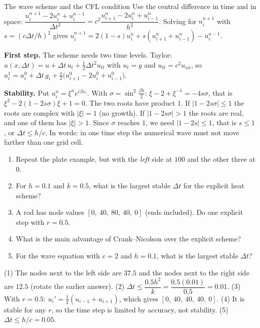 \begin{derivbox}{The wave scheme and the CFL condition}
Use the central difference in time and in space: $\dfrac{u_i^{n+1} - 2u_i^n + u_i^{n-1}}{\Delta t^2} = c^2\dfrac{u_{i+1}^n - 2u_i^n + u_{i-1}^n}{h^2}$. Solving for $u_i^{n+1}$ with $s = (c\Delta t/h)^2$ gives $u_i^{n+1} = 2(1-s)u_i^n + s(u_{i+1}^n + u_{i-1}^n) - u_i^{n-1}$.

\textbf{First step.} The scheme needs two time levels. Taylor: $u(x,\Delta t) = u + \Delta t\,u_t + \tfrac12\Delta t^2u_{tt}$ with $u_t = g$ and $u_{tt} = c^2u_{xx}$, so $u_i^1 = u_i^0 + \Delta t\,g_i + \tfrac s2\big(u_{i+1}^0 - 2u_i^0 + u_{i-1}^0\big)$.

\textbf{Stability.} Put $u_i^n = \xi^ne^{i\beta x_i}$. With $\sigma = \sin^2\frac{\beta h}{2}$: $\xi - 2 + \xi^{-1} = -4s\sigma$, that is $\xi^2 - 2(1 - 2s\sigma)\xi + 1 = 0$. The two roots have product $1$. If $|1 - 2s\sigma|\le1$ the roots are complex with $|\xi|=1$ (no growth). If $|1-2s\sigma|>1$ the roots are real, and one of them has $|\xi|>1$. Since $\sigma$ reaches $1$, we need $|1 - 2s|\le1$, that is $s\le1$, or $\Delta t\le h/c$. In words: in one time step the numerical wave must not move farther than one grid cell.
\end{derivbox}

\begin{practicebox}
\begin{enumerate}
  \item Repeat the plate example, but with the \emph{left} side at $100$ and the other three at $0$.
  \item For $h=0.1$ and $k=0.5$, what is the largest stable $\Delta t$ for the explicit heat scheme?
  \item A rod has node values $[0,\ 40,\ 80,\ 40,\ 0]$ (ends included). Do one explicit step with $r=0.5$.
  \item What is the main advantage of Crank--Nicolson over the explicit scheme?
  \item For the wave equation with $c=2$ and $h=0.1$, what is the largest stable $\Delta t$?
\end{enumerate}
\end{practicebox}

\begin{answerbox}
(1) The nodes next to the left side are $37.5$ and the nodes next to the right side are $12.5$ (rotate the earlier answer). \quad (2) $\Delta t\le \dfrac{0.5h^2}{k} = \dfrac{0.5(0.01)}{0.5} = 0.01$. \quad (3) With $r=0.5$: $u_i' = \tfrac12(u_{i-1} + u_{i+1})$, which gives $[0,\ 40,\ 40,\ 40,\ 0]$. \quad (4) It is stable for any $r$, so the time step is limited by accuracy, not stability. \quad (5) $\Delta t\le h/c = 0.05$.
\end{answerbox}
